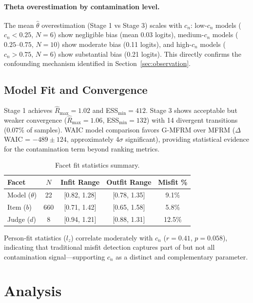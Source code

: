 \documentclass[letterpaper,11pt]{article}
\begin{document}
\paragraph{Theta overestimation by contamination level.} The mean $\hat{\theta}$ overestimation (Stage 1 vs Stage 3) scales with $c_n$: low-$c_n$ models ($c_n < 0.25$, $N = 6$) show negligible bias (mean 0.03 logits), medium-$c_n$ models ($0.25$--$0.75$, $N = 10$) show moderate bias (0.11 logits), and high-$c_n$ models ($c_n > 0.75$, $N = 6$) show substantial bias (0.21 logits). This directly confirms the confounding mechanism identified in Section~\ref{sec:observation}.

\subsection{Model Fit and Convergence}

Stage 1 achieves $\hat{R}_{\max} = 1.02$ and ESS$_{\min} = 412$. Stage 3 shows acceptable but weaker convergence ($\hat{R}_{\max} = 1.06$, ESS$_{\min} = 132$) with 14 divergent transitions (0.07\% of samples). WAIC model comparison favors G-MFRM over MFRM ($\Delta$WAIC = $-489 \pm 124$, approximately 4$\sigma$ significant), providing statistical evidence for the contamination term beyond ranking metrics.

\begin{table}[t]
\centering
\caption{Facet fit statistics summary.}
\label{tab:fit_stats}
\small
\begin{tabular}{lcccc}
\toprule
Facet & $N$ & Infit Range & Outfit Range & Misfit \% \\
\midrule
Model ($\theta$) & 22 & [0.82, 1.28] & [0.78, 1.35] & 9.1\% \\
Item ($b$) & 660 & [0.71, 1.42] & [0.65, 1.58] & 5.8\% \\
Judge ($d$) & 8 & [0.94, 1.21] & [0.88, 1.31] & 12.5\% \\
\bottomrule
\end{tabular}
\end{table}

Person-fit statistics ($l_z$) correlate moderately with $c_n$ ($r = 0.41$, $p = 0.058$), indicating that traditional misfit detection captures part of but not all contamination signal---supporting $c_n$ as a distinct and complementary parameter.

\section{Analysis}
\label{sec:analysis}
\end{document}
